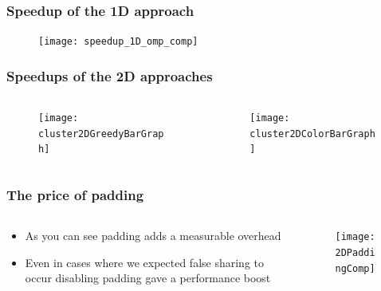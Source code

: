 \begin{frame}
	\frametitle{Speedup of the 1D approach}
	\begin{figure}
		\centering
		\texttt{[image: speedup\_1D\_omp\_comp]}
		\label{fig:speedup1dompcomp}
	\end{figure}
	
\end{frame}

\begin{frame}
	\frametitle{Speedups of the 2D approaches}
	\begin{columns}
		
	\begin{column}{0.5\linewidth}
		\begin{figure}
			\centering
			\texttt{[image: cluster2DGreedyBarGraph]}
			\label{fig:cluster2dgreedybargraph}
		\end{figure}
		
	\end{column}
	
	\begin{column}{0.5\linewidth}
		\begin{figure}
			\centering
			\texttt{[image: cluster2DColorBarGraph]}
			\label{fig:cluster2dcolorbargraph}
		\end{figure}
	\end{column}
	\end{columns}	
\end{frame}

\begin{frame}
	\frametitle{The price of padding}
	\vspace{0.8cm}
	\begin{columns}
		\begin{column}{0.4\linewidth}
			\large
			\begin{itemize}
				\item As you can see padding adds a measurable overhead
				\item Even in cases where we expected false sharing to occur disabling padding gave a performance boost
			\end{itemize}
			
		\end{column}
		\begin{column}{0.6\linewidth}
			\vspace{-1.6cm}
				\begin{figure}
				\centering
				\texttt{[image: 2DPaddingComp]}
				\label{fig:2dpaddingcomp}
			\end{figure}
		\end{column}
	\end{columns}
\end{frame}


